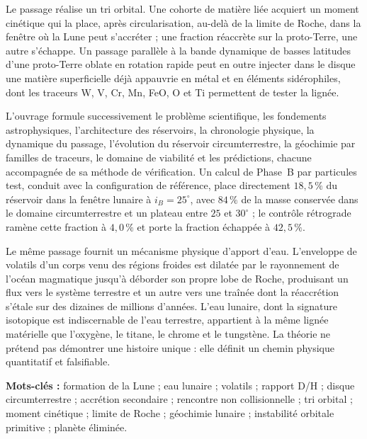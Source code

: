 \documentclass[11pt,a4paper,openany]{report}
\begin{document}
Le passage réalise un tri orbital. Une cohorte de matière liée acquiert un moment cinétique qui
la place, après circularisation, au-delà de la limite de Roche, dans la fenêtre où la Lune peut
s'accréter ; une fraction réaccrète sur la proto-Terre, une autre s'échappe. Un passage parallèle
à la bande dynamique de basses latitudes d'une proto-Terre oblate en rotation rapide peut
en outre injecter dans le disque une matière superficielle déjà appauvrie en métal et en éléments
sidérophiles, dont les traceurs W, V, Cr, Mn, FeO, O et Ti permettent de tester la lignée.

L'ouvrage formule successivement le problème scientifique, les fondements astrophysiques,
l'architecture des réservoirs, la chronologie physique, la dynamique du passage, l'évolution du
réservoir circumterrestre, la géochimie par familles de traceurs, le domaine de viabilité et les
prédictions, chacune accompagnée de sa méthode de vérification. Un calcul de Phase~B par
particules test, conduit avec la configuration de référence, place directement $18{,}5\,\%$ du
réservoir dans la fenêtre lunaire à $i_B=25^\circ$, avec $84\,\%$ de la masse conservée dans le
domaine circumterrestre et un plateau entre $25$ et $30^\circ$ ; le contrôle rétrograde ramène
cette fraction à $4{,}0\,\%$ et porte la fraction échappée à $42{,}5\,\%$.

Le même passage fournit un mécanisme physique d'apport d'eau. L'enveloppe de volatils d'un corps
venu des régions froides est dilatée par le rayonnement de l'océan magmatique jusqu'à déborder son
propre lobe de Roche, produisant un flux vers le système terrestre et un autre vers une traînée
dont la réaccrétion s'étale sur des dizaines de millions d'années. L'eau lunaire, dont la
signature isotopique est indiscernable de l'eau terrestre, appartient à la même lignée matérielle
que l'oxygène, le titane, le chrome et le tungstène. La théorie ne prétend pas démontrer une
histoire unique : elle définit un chemin physique quantitatif et falsifiable.

\bigskip
\noindent\textbf{Mots-clés :} formation de la Lune ; eau lunaire ; volatils ; rapport D/H ;
disque circumterrestre ; accrétion secondaire ; rencontre non collisionnelle ; tri orbital ;
moment cinétique ; limite de Roche ; géochimie lunaire ; instabilité orbitale primitive ;
planète éliminée.
\end{document}
